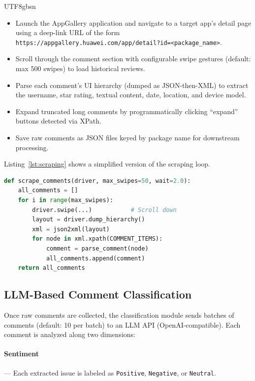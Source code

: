 \documentclass[11pt,a4paper]{article}
\begin{document}
\begin{CJK*}{UTF8}{gbsn}
\begin{itemize}[nosep]
  \item Launch the AppGallery application and navigate to a target app's detail page using a deep-link URL of the form \texttt{https://appgallery.huawei.com/app/detail?id=<package\_name>}.
  \item Scroll through the comment section with configurable swipe gestures (default: max 500 swipes) to load historical reviews.
  \item Parse each comment's UI hierarchy (dumped as JSON-then-XML) to extract the username, star rating, textual content, date, location, and device model.
  \item Expand truncated long comments by programmatically clicking ``expand'' buttons detected via XPath.
  \item Save raw comments as JSON files keyed by package name for downstream processing.
\end{itemize}

Listing~\ref{lst:scraping} shows a simplified version of the scraping loop.

\begin{lstlisting}[language=Python, caption={Simplified comment scraping loop (from \texttt{comments.py}).}, label=lst:scraping]
def scrape_comments(driver, max_swipes=50, wait=2.0):
    all_comments = []
    for i in range(max_swipes):
        driver.swipe(...)           # Scroll down
        layout = driver.dump_hierarchy()
        xml = json2xml(layout)
        for node in xml.xpath(COMMENT_ITEMS):
            comment = parse_comment(node)
            all_comments.append(comment)
    return all_comments
\end{lstlisting}

\subsection{LLM-Based Comment Classification}

Once raw comments are collected, the classification module sends batches of comments (default: 10 per batch) to an LLM API (OpenAI-compatible). Each comment is analyzed along two dimensions:

\paragraph{Sentiment} --- Each extracted issue is labeled as \texttt{Positive}, \texttt{Negative}, or \texttt{Neutral}.


\end{CJK*}
\end{document}
